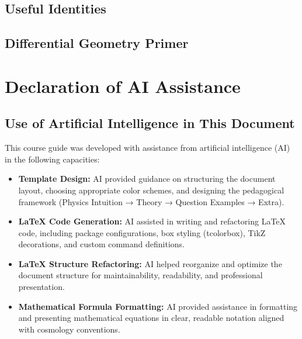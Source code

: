 \documentclass[12pt, a4paper, openright]{report}
\begin{document}
\section{Useful Identities}

\lipsum[25][1-8]   %

\section{Differential Geometry Primer}

\lipsum[26][1-8]   %

\chapter{Declaration of AI Assistance}

\section{Use of Artificial Intelligence in This Document}

This course guide was developed with assistance from artificial intelligence (AI) in the following capacities:

\begin{itemize}
  \item \textbf{Template Design:} AI provided guidance on structuring the document layout,
        choosing appropriate color schemes, and designing the pedagogical framework
        (Physics Intuition → Theory → Question Examples → Extra).
  
  \item \textbf{LaTeX Code Generation:} AI assisted in writing and refactoring LaTeX code,
        including package configurations, box styling (tcolorbox), TikZ decorations,
        and custom command definitions.
  
  \item \textbf{LaTeX Structure Refactoring:} AI helped reorganize and optimize the document
        structure for maintainability, readability, and professional presentation.
  
  \item \textbf{Mathematical Formula Formatting:} AI provided assistance in formatting and
        presenting mathematical equations in clear, readable notation aligned with
        cosmology conventions.
\end{itemize}
\end{document}
